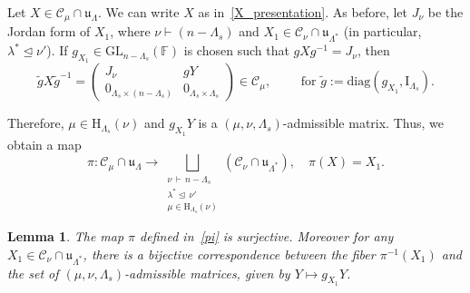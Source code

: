 \documentclass[12pt,a4paper,reqno]{amsart}
\theoremstyle{plain}
\newtheorem{lemma}[theorem]{Lemma}
\theoremstyle{definition}
\newcommand{\less}{\unlhd}
\newcommand{\FF}{{\mathbb{F}}}
\newcommand{\1}{\mathds{1}}
\newcommand{\C}{\mathcal{C}}
\newcommand{\GL}{\mathrm{GL}}
\newcommand{\HH}{\mathrm{H}}
\renewcommand{\u}{\mathfrak{u}}
\begin{document}
 
Let $X\in \C_\mu\cap \mathfrak u_\Lambda$. We can write $X$ as
in~\cref{X_presentation}.
 As before, let $J_\nu$ be the Jordan form of $X_1$, where $\nu\vdash (n-\Lambda_s)$ and $X_1\in \C_{\nu}\cap \u_{\Lambda^*}$ (in particular,  $\lambda^*\less\nu'$).  If $g_{X_1}^{}\in \GL_{n-\Lambda_s}(\FF)$ is chosen such that $gXg^{-1}=J_\nu$, then
\begin{equation}
\tilde gX\tilde g^{-1}
=
\left(\begin{array}{c|c}
J_{\nu} & gY\\ \hline
0_{\Lambda_s\times (n-\Lambda_s)} & 0_{\Lambda_s\times\Lambda_s}
\end{array}\right)
\in \C_\mu,  \qquad\text{ for } \tilde{g}:=\mathrm{diag}(g_{X_1},\mathrm{I}_{\Lambda_s}).
\end{equation}


Therefore, $\mu\in \HH_{\Lambda_s}(\nu)$ and $g_{X_1}^{}Y$ is a $(\mu,\nu,\Lambda_s)$-admissible matrix. Thus, we
obtain a map
\begin{equation}\label{pi}
\pi: \C_\mu\cap \u_\Lambda \longrightarrow  \bigsqcup_{\substack{\nu\,\vdash\, n-\Lambda_s\\[0.06cm]\lambda^*\less\, \nu' \\[0.06cm] \mu\in \HH_{\Lambda_s}(\nu)}} (\C_\nu\cap \u_{\Lambda^*}),\quad\pi(X)=X_1.
\end{equation}
\begin{lemma}\label{recursive-main_lemma} The map $\pi$ defined in~\cref{pi} is surjective. Moreover for any $X_1\in \C_\nu \cap \u_{\Lambda^*}$, there is a bijective correspondence between  the fiber $\pi^{-1}(X_1)$ and the set of $(\mu,\nu,\Lambda_s)$-admissible matrices, given by $Y\mapsto g_{X_1}^{}Y$.  
\end{lemma}
\end{document}
